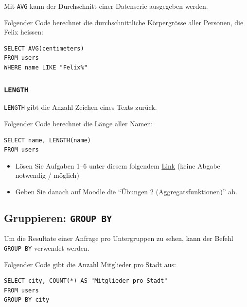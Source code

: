 Mit \lstinline|AVG| kann der Durchschnitt einer Datenserie ausgegeben werden.

\begin{myexample}
Folgender Code berechnet die durchschnittliche Körpergrösse aller Personen, die Felix heissen:

\begin{lstlisting}
SELECT AVG(centimeters) 
FROM users 
WHERE name LIKE "Felix%"
\end{lstlisting}
\end{myexample}

\subsubsection{\texorpdfstring{\lstinline|LENGTH|}{LENGTH}}

\lstinline|LENGTH| gibt die Anzahl Zeichen eines Texts zurück.

\begin{myexample}
Folgender Code berechnet die Länge aller Namen:

\begin{lstlisting}
SELECT name, LENGTH(name) 
FROM users
\end{lstlisting}
\end{myexample}

\begin{myexercise}
  \begin{itemize}
    \item Lösen Sie Aufgaben 1--6 unter diesem folgendem \href{https://sql-tutorial.de/home/uebungen.php?lektion=2}{Link} (keine Abgabe notwendig / möglich)
    \item Geben Sie danach auf Moodle die \enquote{Übungen 2 (Aggregatsfunktionen)} ab.
  \end{itemize}
\end{myexercise}

\subsection{Gruppieren: \texorpdfstring{\lstinline|GROUP BY|}{GROUP BY}}
Um die Resultate einer Anfrage pro Untergruppen zu sehen, kann der Befehl \lstinline|GROUP BY| verwendet werden.

\begin{myexample}
Folgender Code gibt die Anzahl Mitglieder pro Stadt aus:
\begin{lstlisting}
SELECT city, COUNT(*) AS "Mitglieder pro Stadt" 
FROM users 
GROUP BY city
\end{lstlisting}
\end{myexample}

